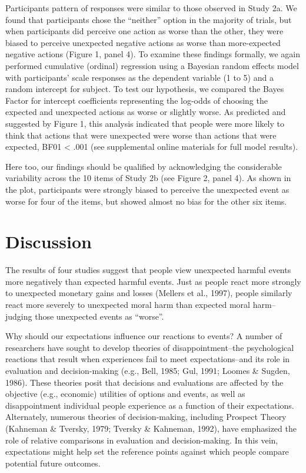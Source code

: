 \documentclass[10pt, letterpaper]{article}
\begin{document}
Participants pattern of responses were similar to those observed in
Study 2a. We found that participants chose the ``neither'' option in the
majority of trials, but when participants did perceive one action as
worse than the other, they were biased to perceive unexpected negative
actions as worse than more-expected negative actions (Figure 1, panel
4). To examine these findings formally, we again performed cumulative
(ordinal) regression using a Bayesian random effects model with
participants' scale responses as the dependent variable (1 to 5) and a
random intercept for subject. To test our hypothesis, we compared the
Bayes Factor for intercept coefficients representing the log-odds of
choosing the expected and unexpected actions as worse or slightly worse.
As predicted and suggested by Figure 1, this analysis indicated that
people were more likely to think that actions that were unexpected were
worse than actions that were expected, BF01 \textless{} .001 (see
supplemental online materials for full model results).

Here too, our findings should be qualified by acknowledging the
considerable variability across the 10 items of Study 2b (see Figure 2,
panel 4). As shown in the plot, participants were strongly biased to
perceive the unexpected event as worse for four of the items, but showed
almost no bias for the other six items.

\section{Discussion}\label{discussion}

The results of four studies suggest that people view unexpected harmful
events more negatively than expected harmful events. Just as people
react more strongly to unexpected monetary gains and losses (Mellers et
al., 1997), people similarly react more severely to unexpected moral
harm than expected moral harm--judging those unexpected events as
``worse''.

Why should our expectations influence our reactions to events? A number
of researchers have sought to develop theories of disappointment--the
psychological reactions that result when experiences fail to meet
expectations--and its role in evaluation and decision-making (e.g.,
Bell, 1985; Gul, 1991; Loomes \& Sugden, 1986). These theories posit
that decisions and evaluations are affected by the objective (e.g.,
economic) utilities of options and events, as well as disappointment
individual people experience as a function of their expectations.
Alternately, numerous theories of decision-making, including Prospect
Theory (Kahneman \& Tversky, 1979; Tversky \& Kahneman, 1992), have
emphasized the role of relative comparisons in evaluation and
decision-making. In this vein, expectations might help set the reference
points against which people compare potential future outcomes.
\end{document}
